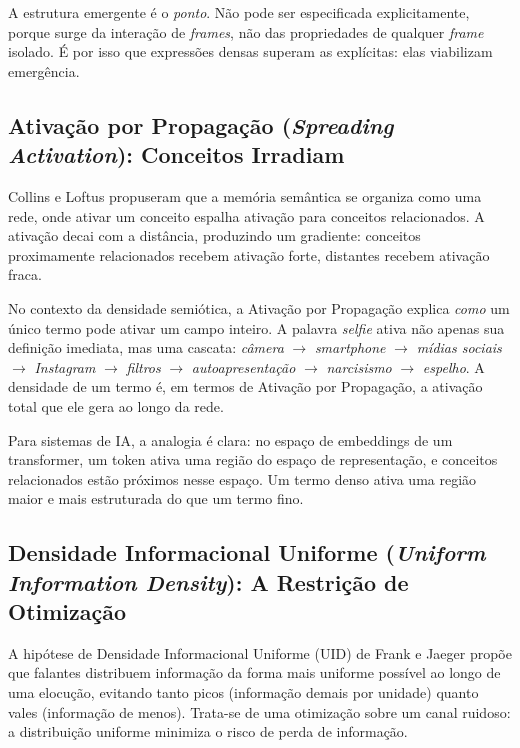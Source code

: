 \documentclass[12pt,a4paper]{article}
\begin{document}
A estrutura emergente é o \textit{ponto}.
Não pode ser especificada explicitamente, porque surge da interação de \textit{frames}, não das propriedades de qualquer \textit{frame} isolado.
É por isso que expressões densas superam as explícitas: elas viabilizam emergência.

\subsection{Ativação por Propagação (\textit{Spreading Activation}): Conceitos Irradiam}
\label{subsec:spreading}

Collins e Loftus \cite{collins1975} propuseram que a memória semântica se organiza como uma rede, onde ativar um conceito espalha ativação para conceitos relacionados.
A ativação decai com a distância, produzindo um gradiente: conceitos proximamente relacionados recebem ativação forte, distantes recebem ativação fraca.

No contexto da densidade semiótica, a Ativação por Propagação explica \textit{como} um único termo pode ativar um campo inteiro.
A palavra \textit{selfie} ativa não apenas sua definição imediata, mas uma cascata: \textit{câmera} $\rightarrow$ \textit{smartphone} $\rightarrow$ \textit{mídias sociais} $\rightarrow$ \textit{Instagram} $\rightarrow$ \textit{filtros} $\rightarrow$ \textit{autoapresentação} $\rightarrow$ \textit{narcisismo} $\rightarrow$ \textit{espelho}.
A densidade de um termo é, em termos de Ativação por Propagação, a ativação total que ele gera ao longo da rede.

Para sistemas de IA, a analogia é clara: no espaço de embeddings de um transformer, um token ativa uma região do espaço de representação, e conceitos relacionados estão próximos nesse espaço.
Um termo denso ativa uma região maior e mais estruturada do que um termo fino.

\subsection{Densidade Informacional Uniforme (\textit{Uniform Information Density}): A Restrição de Otimização}
\label{subsec:uid}

A hipótese de Densidade Informacional Uniforme (UID) de Frank e Jaeger \cite{frank2008} propõe que falantes distribuem informação da forma mais uniforme possível ao longo de uma elocução, evitando tanto picos (informação demais por unidade) quanto vales (informação de menos).
Trata-se de uma otimização sobre um canal ruidoso: a distribuição uniforme minimiza o risco de perda de informação.
\end{document}
